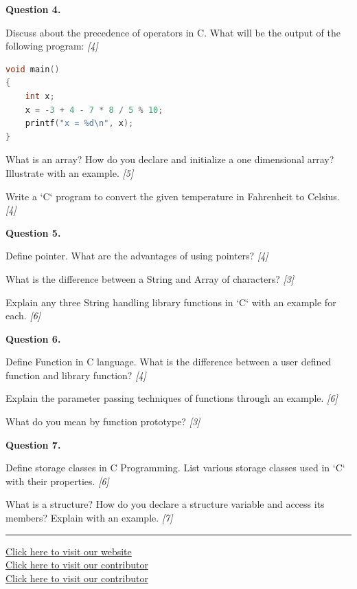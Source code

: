 \documentclass[11pt,a4paper]{article}
\newcommand{\pts}[1]{\hfill\textit{[#1]}}
\begin{document}
\medskip\noindent\textbf{Question 4.}
\begin{parts}
  \item Discuss about the precedence of operators in C. What will be the output of the following program: \pts{4}
\begin{lstlisting}[language=C]
void main()
{
    int x;
    x = -3 + 4 - 7 * 8 / 5 % 10;
    printf("x = %d\n", x);
}
\end{lstlisting}
  \item What is an array? How do you declare and initialize a one dimensional array? Illustrate with an example. \pts{5}
  \item Write a `C` program to convert the given temperature in Fahrenheit to Celsius. \pts{4}
\end{parts}

\medskip\noindent\textbf{Question 5.}
\begin{parts}
  \item Define pointer. What are the advantages of using pointers? \pts{4}
  \item What is the difference between a String and Array of characters? \pts{3}
  \item Explain any three String handling library functions in `C` with an example for each. \pts{6}
\end{parts}

\medskip\noindent\textbf{Question 6.}
\begin{parts}
  \item Define Function in C language. What is the difference between a user defined function and library function? \pts{4}
  \item Explain the parameter passing techniques of functions through an example. \pts{6}
  \item What do you mean by function prototype? \pts{3}
\end{parts}

\medskip\noindent\textbf{Question 7.}
\begin{parts}
  \item Define storage classes in C Programming. List various storage classes used in `C` with their properties. \pts{6}
  \item What is a structure? How do you declare a structure variable and access its members? Explain with an example. \pts{7}
\end{parts}

\vfill
\rule{\linewidth}{0.4pt}
\begin{center}\small
\href{https://bhu-exam.vercel.app/}{Click here to visit our website}\\[4pt]\href{https://me-aryan.vercel.app/}{Click here to visit our contributor}\\[4pt]\href{https://quashan-me.vercel.app/}{Click here to visit our contributor}
\end{center}
\end{document}

